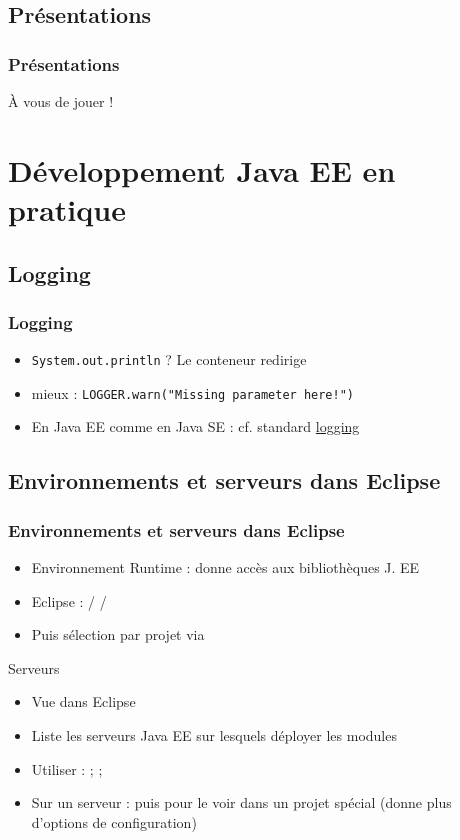 \documentclass[english, french]{beamer}
\begin{document}
\subsection{Présentations}
\begin{frame}
	\frametitle{Présentations}
	À vous de jouer !
\end{frame}

\section[J. EE en pratique]{Développement Java EE en pratique}
\subsection{Logging}
\begin{frame}
	\frametitle{Logging}
	\begin{itemize}
		\item \texttt{System.out.println} ? \pause Le conteneur redirige\pause
		\item \alert{mieux} : \texttt{LOGGER.warn("Missing parameter here!")}
		\item En Java EE comme en Java SE : cf. standard \href{http://docs.oracle.com/javase/8/docs/technotes/guides/logging/index.html}{logging}
	\end{itemize}
\end{frame}

\subsection[Environnements et serveurs]{Environnements et serveurs dans Eclipse}
\begin{frame}
	\frametitle{Environnements et serveurs dans Eclipse}
	\begin{itemize}
		\item Environnement Runtime : donne accès aux bibliothèques J. EE
		\item Eclipse :  /  / 
		\item Puis sélection par projet via 
	\end{itemize}
	\begin{block}{Serveurs}
		\begin{itemize}
			\item Vue  dans Eclipse
			\item Liste les serveurs Java EE sur lesquels déployer les modules
			\item Utiliser :  ;  ; 
			\item Sur un serveur :  puis  pour le voir dans un projet spécial (donne plus d’options de configuration)
		\end{itemize}
	\end{block}
\end{frame}
\end{document}
